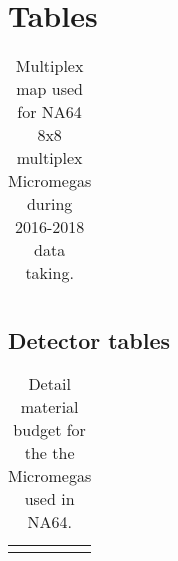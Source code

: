 
\chapter{Tables} %

\label{AppendixF} %

\begin{table}[h!]
  \centering
  \begin{tabular}{|r|l|}
  \end{tabular}
  \caption[original Multiplex map]{Multiplex map used for NA64 8x8 \mms multiplex Micromegas during 2016-2018 data taking.}
  \label{tab:mm-map-original}
\end{table}

\section{Detector tables}
\label{appF:detector-tables}

\begin{table}[bth!]
\centering
\begin{tabular}{|l|c|c|}
&&
\end{tabular}
\caption[material budget MM]{Detail material budget for the the Micromegas used in NA64.}
\label{tab:mm-mbudget}
\end{table}

